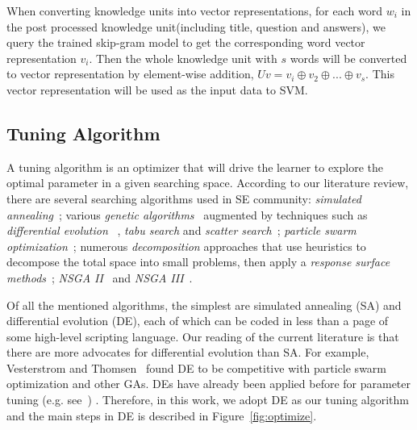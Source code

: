 \documentclass[sigconf,review, anonymous]{acmart}
\theoremstyle{break}
\newcommand{\fig}[1]{Figure~\ref{fig:#1}}
\begin{document}
When converting knowledge units into vector representations, 
for each word $w_i$ in the post processed knowledge unit(including title, question and answers),
we query the trained skip-gram model to get the corresponding word vector representation $v_i$.
Then the whole knowledge unit with $s$ words
will be converted to vector representation by element-wise addition, $Uv = v_i \oplus v_2 \oplus...\oplus v_s $. 
This vector representation will be used
as the input data to SVM.




\subsection{Tuning Algorithm}

A tuning algorithm is an optimizer that will drive the learner to explore
the optimal parameter in a given searching space. According to our
literature review, there are several searching algorithms used in 
SE community:{\em 
simulated annealing}~\cite{feather2002converging,menzies2007data};
 various {\em genetic algorithms}~\cite{jones1996automatic,harman2007current, arcuri2011parameter} augmented by
techniques such as {\em differential evolution}
~\cite{storn1997differential, fu2016tuning, fu2016differential,chaves2015differential,agrawal2016wrong}, 
{\em tabu search} and {\em scatter search}~\cite{beausoleil2006moss,molina2007sspmo,corazza2013using};
{\em particle swarm optimization}~\cite{windisch2007applying}; 
numerous {\em decomposition} approaches that use
    heuristics to decompose the total space into   small problems,   then apply a
    {\em response surface methods}~\cite{krall2015gale};
     {\em NSGA II} ~\cite{zhang2007multi}and {\em NSGA III}~\cite{mkaouer2014high}.


Of all the mentioned algorithms,  the simplest are simulated annealing (SA)  and 
differential evolution (DE), each of which can be coded in less than a page of some high-level scripting language.
 Our reading of the current literature is that there are more  advocates for
differential evolution than SA. For example,  Vesterstrom and Thomsen~\cite{Vesterstrom04} found DE to be competitive with 
 particle swarm optimization and other GAs.  DEs have already been applied before for 
 parameter tuning (e.g. see~\cite{omran2005differential, chiha2012tuning, fu2016tuning, fu2016differential, agrawal2016wrong}) .
Therefore, in this work, we adopt DE as our tuning algorithm and 
the main steps in DE is described in \fig{optimize}.
\end{document}
